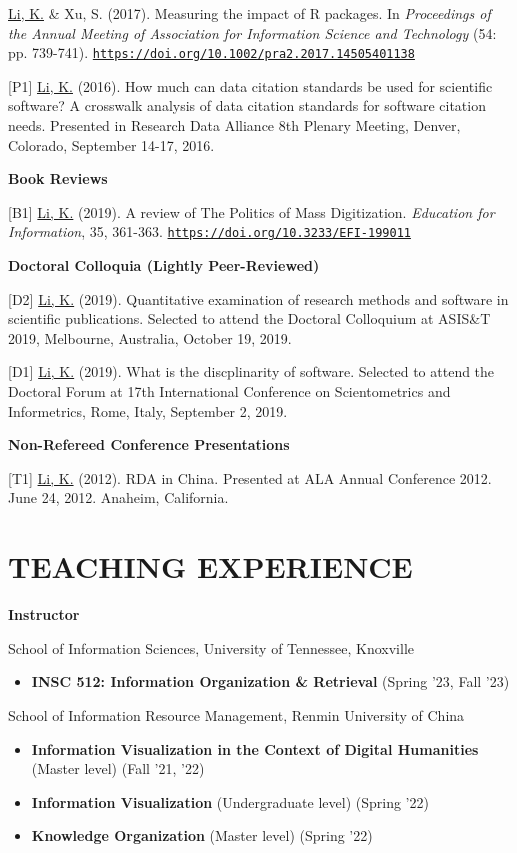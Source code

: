 \documentclass[margin, 10pt]{res} %
\begin{document}
\begin{resume}
[P2] \underline{Li, K.} \& Xu, S. (2017). Measuring the impact of R packages. In \textit{Proceedings of the Annual Meeting of Association for Information Science and Technology} (54: pp. 739-741). \href{https://doi.org/10.1002/pra2.2017.14505401138}{\nolinkurl{https://doi.org/10.1002/pra2.2017.14505401138}}

[P1] \underline{Li, K.} (2016). How much can data citation standards be used for scientific software? A crosswalk analysis of data citation standards for software citation needs. Presented in Research Data Alliance 8th Plenary Meeting, Denver, Colorado, September 14-17, 2016.

\textbf{Book Reviews}

[B1] \underline{Li, K.} (2019). A review of The Politics of Mass Digitization. \textit{Education for Information}, 35, 361-363. \href{https://doi.org/10.3233/EFI-199011}{\nolinkurl{https://doi.org/10.3233/EFI-199011}}

\textbf{Doctoral Colloquia (Lightly Peer-Reviewed)}

[D2] \underline{Li, K.} (2019). Quantitative examination of research methods and software in scientific publications. Selected to attend the Doctoral Colloquium at ASIS\&T 2019, Melbourne, Australia, October 19, 2019.

[D1] \underline{Li, K.} (2019). What is the discplinarity of software. Selected to attend the Doctoral Forum at 17th International Conference on Scientometrics and Informetrics, Rome, Italy, September 2, 2019.

\textbf{Non-Refereed Conference Presentations}

[T1] \underline{Li, K.} (2012). RDA in China. Presented at ALA Annual Conference 2012. June 24, 2012. Anaheim, California.

\section{TEACHING EXPERIENCE}

\textbf{Instructor}

School of Information Sciences, University of Tennessee, Knoxville
\begin{itemize}
\item \textbf{INSC 512: Information Organization \& Retrieval} (Spring '23, Fall '23)
\end{itemize}

School of Information Resource Management, Renmin University of China
\begin{itemize}
\item \textbf{Information Visualization in the Context of Digital Humanities} (Master level) (Fall '21, '22)
\item \textbf{Information Visualization} (Undergraduate level) (Spring '22)
\item \textbf{Knowledge Organization} (Master level) (Spring '22)
\end{itemize}


\end{resume}
\end{document}
